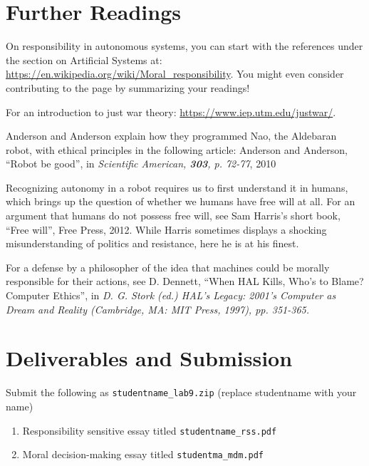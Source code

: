 \documentclass[letta4 paper]{article}
\numberwithin{equation}{section}
\newcommand{\0}{\mathbf{0}}
\begin{document}
	
	\section{Further Readings}
	On responsibility in autonomous systems, you can start with the references under the section on Artificial Systems at: \url{https://en.wikipedia.org/wiki/Moral_responsibility}. 
	You might even consider contributing to the page by summarizing your readings!
	
	For an introduction to just war theory: \url{https://www.iep.utm.edu/justwar/}.
	
	Anderson and Anderson explain how they programmed Nao, the Aldebaran robot, with ethical principles in the following article: Anderson and Anderson, ``Robot be good'', in \textit{Scientific American, \textbf{303}, p. 72-77}, 2010
	
	Recognizing autonomy in a robot requires us to first understand it in humans, which brings up the question of whether we humans have free will at all. For an argument that humans do not possess free will, see Sam Harris's short book, ``Free will'', Free Press, 2012. While Harris sometimes displays a shocking misunderstanding of politics and resistance, here he is at his finest.
	
	For a defense by a philosopher of the idea that machines could be morally
	responsible for their actions, see D. Dennett, ``When HAL Kills, Who's to Blame? Computer Ethics'', in \textit{D. G.
		Stork (ed.) HAL's Legacy: 2001's Computer as Dream and Reality (Cambridge, MA: MIT Press, 1997), pp.
		351-365.}

	\section{Deliverables and Submission}
	Submit the following as \texttt{studentname\_lab9.zip} (replace studentname with your name)
	
	\begin{enumerate}
		\item Responsibility sensitive essay titled \texttt{studentname\_rss.pdf}
		\item Moral decision-making essay titled \texttt{studentma\_mdm.pdf}
	\end{enumerate}
\end{document}

